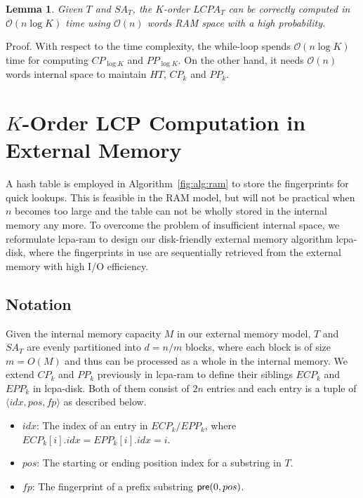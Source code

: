 \documentclass[10pt,journal,compsoc]{IEEEtran}
\newtheorem{Lemma}{Lemma}
\begin{document}
\begin{CJK*}{GBK}{song}
\begin{Lemma}
\label{thm:lcp:ram}
Given $T$ and $SA_T$, the $K$-order $LCPA_T$ can be correctly computed in $\mathcal{O}(n\log K)$ time using $\mathcal{O}(n)$ words RAM space with a high probability.
\end{Lemma}
Proof. With respect to the time complexity, the while-loop spends $\mathcal{O}(n\log K)$ time for computing $CP_{\log K}$ and $PP_{\log K}$. On the other hand, it needs $\mathcal{O}(n)$ words internal space to maintain $HT$, $CP_k$ and $PP_k$.

\section{$K$-Order LCP Computation in External Memory}\label{sec:construction_in_em}

A hash table is employed in Algorithm~\ref{fig:alg:ram} to store the fingerprints for quick lookups. This is feasible in the RAM model, but will not be practical when $n$ becomes too large and the table can not be wholly stored in the internal memory any more. To overcome the problem of insufficient internal space, we reformulate lcpa-ram to design our disk-friendly external memory algorithm lcpa-disk, where the fingerprints in use are sequentially retrieved from the external memory with high I/O efficiency.

\subsection{Notation}

Given the internal memory capacity $M$ in our external memory model, $T$ and $SA_T$ are evenly partitioned into $d=n/m$ blocks, where each block is of size $m=O(M)$ and thus can be processed as a whole in the internal memory. We extend $CP_k$ and $PP_k$ previously in lcpa-ram to define their siblings $ECP_k$ and $EPP_k$ in lcpa-disk. Both of them consist of $2n$ entries and each entry is a tuple of $\langle idx, pos, fp \rangle$ as described below.
\begin{itemize}
\item $idx$: The index of an entry in $ECP_k/EPP_k$, where $ECP_k[i].idx=EPP_k[i].idx=i$.
\item $pos$: The starting or ending position index for a substring in $T$.
\item $fp$: The fingerprint of a prefix substring ${\sf pre}(0,pos)$.
\end{itemize}


\end{CJK*}
\end{document}
